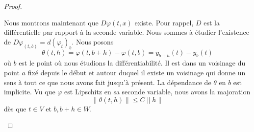 \begin{proof}
\begin{subproof}
            Nous montrons maintenant que \( D\varphi(t,x)\) existe. Pour rappel, \( D\) est la différentielle par rapport à la seconde variable. Nous sommes à étudier l'existence de \( D\varphi_{(t,b)}=d(\varphi_t)_b\). Nous posons
            \begin{equation}
                \theta(t,h)=\varphi(t,b+h)-\varphi(t,b)=y_{b+h}(t)-y_b(t)
            \end{equation}
            où \( b\) est le point où nous étudions la différentiabilité. Il est dans un voisinage du point \( a\) fixé depuis le début et autour duquel il existe un voisinage qui donne un sens à tout ce que nous avons fait jusqu'à présent. La dépendance de \( \theta\) en \( b\) est implicite. Vu que \( \varphi\) est Lipschitz en sa seconde variable, nous avons la majoration
            \begin{equation}        \label{EQooKYELooZlfeed}
                \| \theta(t,h) \|\leq C\| h \|
            \end{equation}
            dès que \( t\in V\) et \( b,b+h\in W\).


\end{subproof}
\end{proof}

